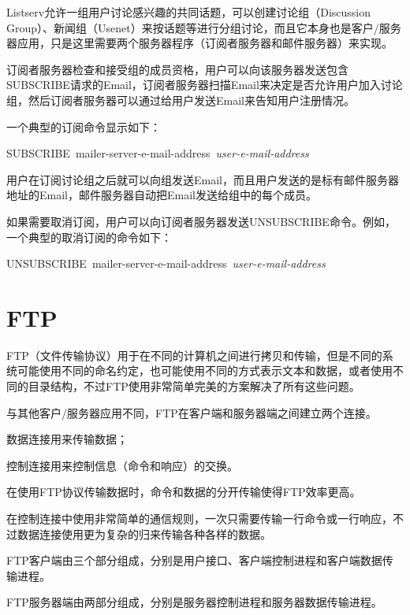 Listserv允许一组用户讨论感兴趣的共同话题，可以创建讨论组（Discussion Group）、新闻组（Usenet）来按话题等进行分组讨论，而且它本身也是客户/服务器应用，只是这里需要两个服务器程序（订阅者服务器和邮件服务器）来实现。



订阅者服务器检查和接受组的成员资格，用户可以向该服务器发送包含SUBSCRIBE请求的Email，订阅者服务器扫描Email来决定是否允许用户加入讨论组，然后订阅者服务器可以通过给用户发送Email来告知用户注册情况。

一个典型的订阅命令显示如下：
\begin{center}
SUBSCRIBE~mailer-server-e-mail-address~\textit{user-e-mail-address}
\end{center}

用户在订阅讨论组之后就可以向组发送Email，而且用户发送的是标有邮件服务器地址的Email，邮件服务器自动把Email发送给组中的每个成员。

如果需要取消订阅，用户可以向订阅者服务器发送UNSUBSCRIBE命令。例如，一个典型的取消订阅的命令如下：
\begin{center}
UNSUBSCRIBE~mailer-server-e-mail-address~\textit{user-e-mail-address}
\end{center}



\chapter{FTP}


FTP（文件传输协议）用于在不同的计算机之间进行拷贝和传输，但是不同的系统可能使用不同的命名约定，也可能使用不同的方式表示文本和数据，或者使用不同的目录结构，不过FTP使用非常简单完美的方案解决了所有这些问题。

与其他客户/服务器应用不同，FTP在客户端和服务器端之间建立两个连接。

\begin{compactitem}
\item 数据连接用来传输数据；
\item 控制连接用来控制信息（命令和响应）的交换。
\end{compactitem}

在使用FTP协议传输数据时，命令和数据的分开传输使得FTP效率更高。

在控制连接中使用非常简单的通信规则，一次只需要传输一行命令或一行响应，不过数据连接使用更为复杂的归来传输各种各样的数据。

FTP客户端由三个部分组成，分别是用户接口、客户端控制进程和客户端数据传输进程。

FTP服务器端由两部分组成，分别是服务器控制进程和服务器数据传输进程。



